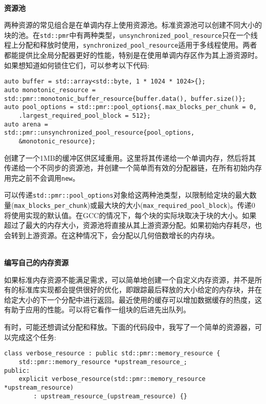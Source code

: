 \hspace*{\fill} \\ %
\noindent
\textbf{资源池}

两种资源的常见组合是在单调内存上使用资源池。标准资源池可以创建不同大小的块的池。在\texttt{std::pmr}中有两种类型，\texttt{unsynchronized\_pool\_resource}只在一个线程上分配和释放时使用，\texttt{synchronized\_pool\_resource}适用于多线程使用。两者都能提供比全局分配器更好的性能，特别是在使用单调内存区作为其上游资源时。如果想知道如何锁住它们，可以参考以下代码:

\begin{lstlisting}[style=styleCXX]
auto buffer = std::array<std::byte, 1 * 1024 * 1024>{};
auto monotonic_resource =
std::pmr::monotonic_buffer_resource{buffer.data(), buffer.size()};
auto pool_options = std::pmr::pool_options{.max_blocks_per_chunk = 0,
	.largest_required_pool_block = 512};
auto arena =
std::pmr::unsynchronized_pool_resource{pool_options,
	&monotonic_resource};
\end{lstlisting}

创建了一个1MB的缓冲区供区域重用。这里将其传递给一个单调内存，然后将其传递给一个不同步的资源池，并创建一个简单而有效的分配器链，在所有初始内存用完之前不会调用\texttt{new}。

可以传递\texttt{std::pmr::pool\_options}对象给这两种池类型，以限制给定块的最大数量(\texttt{max\_blocks\_per\_chunk})或最大块的大小(\texttt{max\_required\_pool\_block})。传递0将使用实现的默认值。在GCC的情况下，每个块的实际块取决于块的大小。如果超过了最大的内存大小，资源池将直接从其上游资源分配。如果初始内存耗尽，也会转到上游资源。在这种情况下，会分配以几何倍数增长的内存块。

\hspace*{\fill} \\ %
\noindent
\textbf{编写自己的内存资源}

如果标准内存资源不能满足需求，可以简单地创建一个自定义内存资源，并不是所有的标准库实现都会提供很好的优化，即跟踪最后释放的大小给定的内存块，并在给定大小的下一个分配中进行返回。最近使用的缓存可以增加数据缓存的热度，这有助于应用的性能。可以将它看作一组块的后进先出队列。

有时，可能还想调试分配和释放。下面的代码段中，我写了一个简单的资源器，可以完成这个任务:

\begin{lstlisting}[style=styleCXX]
class verbose_resource : public std::pmr::memory_resource {
	std::pmr::memory_resource *upstream_resource_;
public:
	explicit verbose_resource(std::pmr::memory_resource *upstream_resource)
		: upstream_resource_(upstream_resource) {}
\end{lstlisting}

